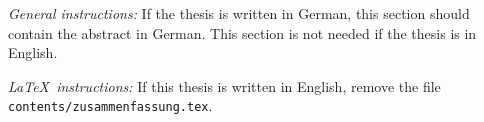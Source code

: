 {\textsl{General instructions:}} 
If the thesis is written in German, this section
should contain the abstract in German. This section is not needed if 
the thesis is in English.

{\textsl{\LaTeX\ instructions:}}
If this thesis is written in English, remove the file\\
{\tt{contents/zusammenfassung.tex}}.


